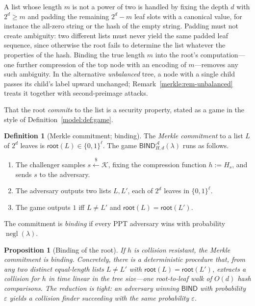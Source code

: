 \documentclass[11pt,a4paper]{article}
\newtheorem{proposition}[theorem]{Proposition}
\theoremstyle{definition}
\newtheorem{definition}[theorem]{Definition}
\theoremstyle{remark}
\DeclareMathOperator{\negl}{negl}
\begin{document}
A list whose length \(m\) is not a power of two is handled by fixing
the depth \(d\) with \(2^d \ge m\) and padding the remaining
\(2^d - m\) leaf slots with a canonical value, for instance the
all-zero string or the hash of the empty string. Padding must not
create ambiguity: two different lists must never yield the same padded
leaf sequence, since otherwise the root fails to determine the list
whatever the properties of the hash. Binding the true length \(m\) into
the root's computation---one further compression of the top node with
an encoding of \(m\)---removes any such ambiguity. In the alternative
\emph{unbalanced} tree, a node with a single child passes its child's
label upward unchanged; Remark~\ref{merkle:rem-unbalanced} treats it
together with second-preimage attacks.

That the root \emph{commits} to the list is a security property, stated
as a game in the style of Definition~\ref{model:def:game}.

\begin{definition}[Merkle commitment; binding]\label{merkle:def-commit}
The \emph{Merkle commitment} to a list \(L\) of \(2^d\) leaves is
\(\mathsf{root}(L) \in \{0,1\}^{\ell}\). The game
\(\mathsf{BIND}^{\mathcal{A}}_{H,d}(\lambda)\) runs as follows.
\begin{enumerate}
\item The challenger samples \(s \xleftarrow{\$} \mathcal{K}\),
  fixing the compression function \(h := H_{s}\), and sends \(s\) to
  the adversary.
\item The adversary outputs two lists \(L, L'\), each of \(2^d\)
  leaves in \(\{0,1\}^{\ell}\).
\item The game outputs \(1\) iff \(L \neq L'\) and
  \(\mathsf{root}(L) = \mathsf{root}(L')\).
\end{enumerate}
The commitment is \emph{binding} if every PPT adversary wins with
probability \(\negl(\lambda)\).
\end{definition}

\begin{proposition}[Binding of the root]\label{merkle:prop-binding}
If \(h\) is collision resistant, the Merkle commitment is binding.
Concretely, there is a deterministic procedure that, from any two
distinct equal-length lists \(L \neq L'\) with
\(\mathsf{root}(L) = \mathsf{root}(L')\), extracts a collision for
\(h\) in time linear in the tree size---one root-to-leaf walk of
\(O(d)\) hash comparisons. The reduction is tight: an adversary
winning \(\mathsf{BIND}\) with probability \(\varepsilon\) yields a
collision finder succeeding with the same probability
\(\varepsilon\).
\end{proposition}
\end{document}
